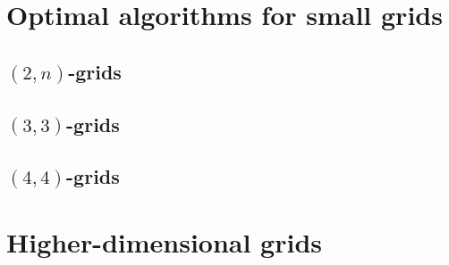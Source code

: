 \documentclass[a4paper,10pt]{article}
\begin{document}
\section{Optimal algorithms for small grids}

\subsection{$(2 , n)$-grids}
\subsection{$(3 , 3)$-grids}
\subsection{$(4 , 4)$-grids}

\section{Higher-dimensional grids}




\end{document}
